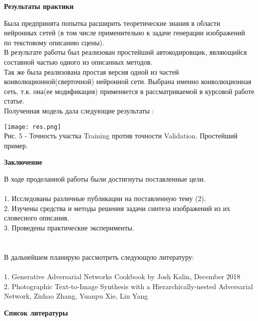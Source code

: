 \documentclass{article}
\begin{document}
\newpage
    \begin{center} 
    \huge \textbf{Результаты практики} \\[0.5cm]
    \end{center} 
      \large Была предпринята попытка расширить теоретические знания в области нейронных сетей (в том числе применительно к задаче генерации изображений по текстовому описанию сцены).\\
      В результате работы был реализован простейший автокодировщик, являющийся составной частью одного из описанных методов.\\
      Так же была реализована простая версия одной из частей конволюционной(сверточной) нейронной сети. Выбрана именно конволюционная сеть, т.к. она(ее модификация) применяется в рассматриваемой в курсовой работе статье. \\
      Полученная модель дала следующие результаты :
      \begin{center} 
      \texttt{[image: res.png]}
      \\
      \caption*{Рис. 5 - Точность участка Training  против точности Validation. Простейший пример.}
      \end{center} 
\newpage
    \begin{center} 
    \huge \textbf{Заключение} \\[0.5cm]
    \end{center} 
      \large В ходе проделанной работы были достигнуты поставленные цели.\\ \\
        1. Исследованы различные публикации на поставленную тему (2).\\
        2. Изучены средства и методы решения задачи синтеза изображений из их словесного описания.\\
        3. Проведены практические эксперименты.\\ \\ \\
    В дальнейшем планирую рассмотреть следующую литературу:\\ \\
        1. Generative Adversarial Networks Cookbook by Josh Kalin, December 2018
\\
        2. Photographic Text-to-Image Synthesis with a Hierarchically-nested Adversarial Network, Zizhao Zhang, Yuanpu Xie, Lin Yang\\
\newpage
    \begin{center} 
    \huge \textbf{Список литературы} \\[0.5cm]
    \end{center} 
\end{document}
